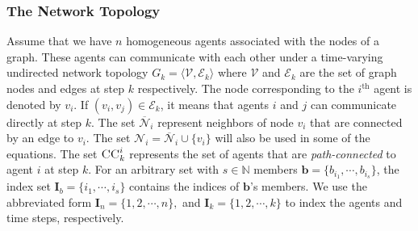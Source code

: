 \documentclass[conference]{IEEEtran}
\theoremstyle{remark}
\newcommand{\bIn}{\boldsymbol{I}_{{n}}}
\newcommand{\bIk}{\boldsymbol{I}_{{k}}}
\begin{document}
\subsubsection*{The Network Topology} 
Assume that we have $n$ homogeneous agents associated with the nodes of a 
graph. These agents can communicate with each other under a time-varying 
undirected network topology $ G_{k} = \langle \mathcal{V},\mathcal{E}_k\rangle 
$ where $\mathcal{V}$ and $\mathcal{E}_k$ are the set of graph nodes and edges 
at step $k$ respectively. The node corresponding to the $i^\text{th}$ agent is 
denoted by $v_i$. If $(v_i,v_j)\in \mathcal{E}_k$, it means that agents $i$ and 
$j$ can communicate directly at step $k$.  The set $\overline{\mathcal{N}}_i$ 
represent 
neighbors of node ${v}_i$ that are connected by an edge to $v_i$. The set 
$\mathcal{N}_i=\overline{\mathcal{N}}_i\cup \{v_i\}$ will also be used in some 
of the equations. The set $\textsc{CC}_k^i$ represents the set of agents 
that are \textit{path-connected} to agent $i$ at step $k$. For an arbitrary set 
with 
$s\in \mathbb{N} $ members $\mathbf{b}=\{b_{i_1},\cdots,b_{i_s}\}$, 
the index set $\boldsymbol{I}_{b}=\{i_1,\cdots,i_{s}\}$ 
contains the indices of $\mathbf{b}$'s members. We use the abbreviated form  $ 
\bIn = 
\{1,2,\cdots,n\},$ and $\bIk = \{1,2,\cdots,k\}$ to index the agents and time 
steps, respectively.
\end{document}
